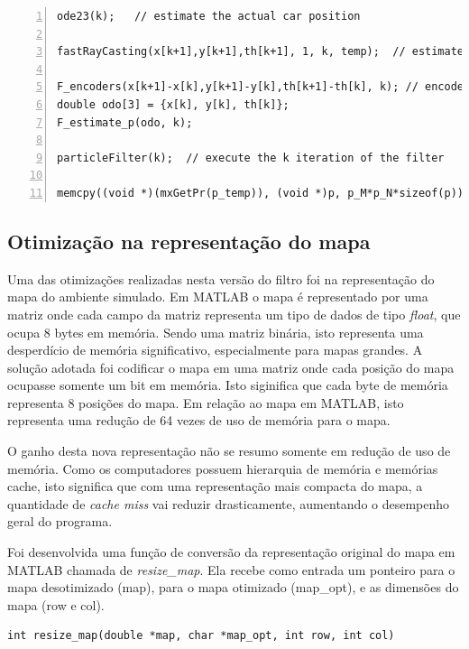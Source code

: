 \documentclass[
	12pt,				%
	openright,			%
	oneside,			%
	a4paper,			%
	english,			%
	french,				%
	spanish,			%
	brazil,				%
	]{abntex2}
\begin{document}
\begin{lstlisting}[style=customc,numbers=left,caption={Parte principal da implementação em C do filtro.}, label=lst:c-filter]
ode23(k);   // estimate the actual car position

fastRayCasting(x[k+1],y[k+1],th[k+1], 1, k, temp);  // estimate the sonar position

F_encoders(x[k+1]-x[k],y[k+1]-y[k],th[k+1]-th[k], k); // encoders
double odo[3] = {x[k], y[k], th[k]};
F_estimate_p(odo, k); 

particleFilter(k);  // execute the k iteration of the filter

memcpy((void *)(mxGetPr(p_temp)), (void *)p, p_M*p_N*sizeof(p)); // save particle position into .mat
\end{lstlisting}


\subsection{Otimização na representação do mapa}
Uma das otimizações realizadas nesta versão do filtro foi na representação do mapa do ambiente simulado. Em MATLAB o mapa é representado por uma matriz onde cada campo da matriz representa um tipo de dados de tipo \emph{float}, que ocupa 8 bytes em memória. Sendo uma matriz binária, isto representa uma desperdício de memória significativo, especialmente para mapas grandes. A solução adotada foi codificar o mapa em uma matriz onde cada posição do mapa ocupasse somente um bit em memória. Isto siginifica que cada byte de memória representa 8 posições do mapa. Em relação ao mapa em MATLAB, isto representa uma redução de 64 vezes de uso de memória para o mapa.

O ganho desta nova representação não se resumo somente em redução de uso de memória. Como os computadores possuem hierarquia de memória e memórias cache, isto significa que com uma representação mais compacta do mapa, a quantidade de \emph{cache miss} vai reduzir drasticamente, aumentando o desempenho geral do programa.

Foi desenvolvida uma função de conversão da representação original do mapa em MATLAB chamada de \emph{resize\_map}. Ela recebe como entrada um ponteiro para o mapa desotimizado (map), para o mapa otimizado (map\_opt), e as dimensões do mapa (row e col). 

\begin{lstlisting}[style=customc,numbers=none]
int resize_map(double *map, char *map_opt, int row, int col)
\end{lstlisting}
\end{document}
